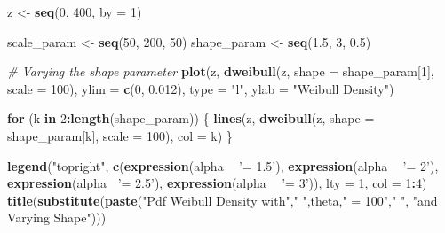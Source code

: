 \documentclass[]{book}
\newenvironment{Shaded}{\begin{snugshade}}{\end{snugshade}}
\newcommand{\KeywordTok}[1]{\textcolor[rgb]{0.13,0.29,0.53}{\textbf{#1}}}
\newcommand{\DataTypeTok}[1]{\textcolor[rgb]{0.13,0.29,0.53}{#1}}
\newcommand{\DecValTok}[1]{\textcolor[rgb]{0.00,0.00,0.81}{#1}}
\newcommand{\FloatTok}[1]{\textcolor[rgb]{0.00,0.00,0.81}{#1}}
\newcommand{\StringTok}[1]{\textcolor[rgb]{0.31,0.60,0.02}{#1}}
\newcommand{\CommentTok}[1]{\textcolor[rgb]{0.56,0.35,0.01}{\textit{#1}}}
\newcommand{\ControlFlowTok}[1]{\textcolor[rgb]{0.13,0.29,0.53}{\textbf{#1}}}
\newcommand{\OperatorTok}[1]{\textcolor[rgb]{0.81,0.36,0.00}{\textbf{#1}}}
\newcommand{\NormalTok}[1]{#1}
\theoremstyle{definition}
\theoremstyle{definition}
\theoremstyle{definition}
\theoremstyle{remark}
\begin{document}
\begin{Shaded}
\begin{Highlighting}[]
\NormalTok{z <-}\StringTok{ }\KeywordTok{seq}\NormalTok{(}\DecValTok{0}\NormalTok{, }\DecValTok{400}\NormalTok{, }\DataTypeTok{by =} \DecValTok{1}\NormalTok{)}

\NormalTok{scale_param <-}\StringTok{ }\KeywordTok{seq}\NormalTok{(}\DecValTok{50}\NormalTok{, }\DecValTok{200}\NormalTok{, }\DecValTok{50}\NormalTok{)}
\NormalTok{shape_param <-}\StringTok{ }\KeywordTok{seq}\NormalTok{(}\FloatTok{1.5}\NormalTok{, }\DecValTok{3}\NormalTok{, }\FloatTok{0.5}\NormalTok{)}

\CommentTok{# Varying the shape parameter}
\KeywordTok{plot}\NormalTok{(z, }\KeywordTok{dweibull}\NormalTok{(z, }\DataTypeTok{shape =}\NormalTok{ shape_param[}\DecValTok{1}\NormalTok{], }\DataTypeTok{scale =} \DecValTok{100}\NormalTok{), }
     \DataTypeTok{ylim =} \KeywordTok{c}\NormalTok{(}\DecValTok{0}\NormalTok{, }\FloatTok{0.012}\NormalTok{), }\DataTypeTok{type =} \StringTok{"l"}\NormalTok{, }\DataTypeTok{ylab =} \StringTok{"Weibull Density"}\NormalTok{)}

\ControlFlowTok{for}\NormalTok{ (k }\ControlFlowTok{in} \DecValTok{2}\OperatorTok{:}\KeywordTok{length}\NormalTok{(shape_param)) \{}
  \KeywordTok{lines}\NormalTok{(z, }\KeywordTok{dweibull}\NormalTok{(z, }\DataTypeTok{shape =}\NormalTok{ shape_param[k], }\DataTypeTok{scale =} \DecValTok{100}\NormalTok{), }\DataTypeTok{col =}\NormalTok{ k)}
\NormalTok{\}}

\KeywordTok{legend}\NormalTok{(}\StringTok{"topright"}\NormalTok{,  }\KeywordTok{c}\NormalTok{(}\KeywordTok{expression}\NormalTok{(alpha }\OperatorTok{~}\StringTok{ '= 1.5'}\NormalTok{), }\KeywordTok{expression}\NormalTok{(alpha }\OperatorTok{~}\StringTok{ '= 2'}\NormalTok{), }
                      \KeywordTok{expression}\NormalTok{(alpha }\OperatorTok{~}\StringTok{'= 2.5'}\NormalTok{), }\KeywordTok{expression}\NormalTok{(alpha }\OperatorTok{~}\StringTok{ '= 3'}\NormalTok{)), }
       \DataTypeTok{lty =} \DecValTok{1}\NormalTok{, }\DataTypeTok{col =} \DecValTok{1}\OperatorTok{:}\DecValTok{4}\NormalTok{)}
\KeywordTok{title}\NormalTok{(}\KeywordTok{substitute}\NormalTok{(}\KeywordTok{paste}\NormalTok{(}\StringTok{"Pdf Weibull Density with"}\NormalTok{,}\StringTok{" "}\NormalTok{,theta,}\StringTok{" = 100"}\NormalTok{,}\StringTok{" "}\NormalTok{, }
                       \StringTok{"and Varying Shape"}\NormalTok{)))}
\end{Highlighting}
\end{Shaded}
\end{document}
